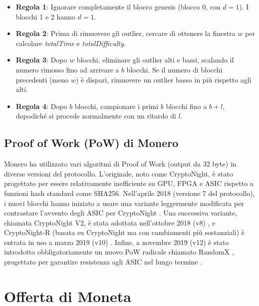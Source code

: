 \begin{itemize}
  \item[] \textbf{Regola 1}: Ignorare completamente il blocco genesis (blocco 0, con $d=1$). I blocchi 1 e 2 hanno $d=1$.
  \item[] \textbf{Regola 2}: Prima di rimuovere gli outlier, cercare di ottenere la finestra $w$ per calcolare \emph{totalTime} e \emph{totalDifficulty}.
  \item[] \textbf{Regola 3}: Dopo $w$ blocchi, eliminare gli outlier alti e bassi, scalando il numero rimosso fino ad arrivare a $b$ blocchi. Se il numero di blocchi precedenti (meno $w$) è dispari, rimuovere un outlier basso in più rispetto agli alti.
  \item[] \textbf{Regola 4}: Dopo $b$ blocchi, campionare i primi $b$ blocchi fino a $b+l$, dopodiché si procede normalmente con un ritardo di $l$.
\end{itemize}


\subsection*{Proof of Work (PoW) di Monero}

Monero ha utilizzato vari algoritmi di Proof of Work (output da 32 byte) in diverse versioni del protocollo. L’originale, noto come CryptoNight, è stato progettato per essere relativamente inefficiente su GPU, FPGA e ASIC \cite{CryptoNight} rispetto a funzioni hash standard come SHA256. Nell’aprile 2018 (versione 7 del protocollo), i nuovi blocchi hanno iniziato a usare una variante leggermente modificata per contrastare l’avvento degli ASIC per CryptoNight \cite{cryptonight7}. Una successiva variante, chiamata CryptoNight V2, è stata adottata nell’ottobre 2018 (v8) \cite{berylliumbullet-v8}, e CryptoNight-R (basata su CryptoNight ma con cambiamenti più sostanziali) è entrata in uso a marzo 2019 (v10) \cite{boronbutterfly-v10}. Infine, a novembre 2019 (v12) è stato introdotto obbligatoriamente un nuovo PoW radicale chiamato RandomX \cite{randomx-pr-5549}, progettato per garantire resistenza agli ASIC nel lungo termine \cite{randomx}.



\section{Offerta di Moneta}
\label{sec:money-supply}

